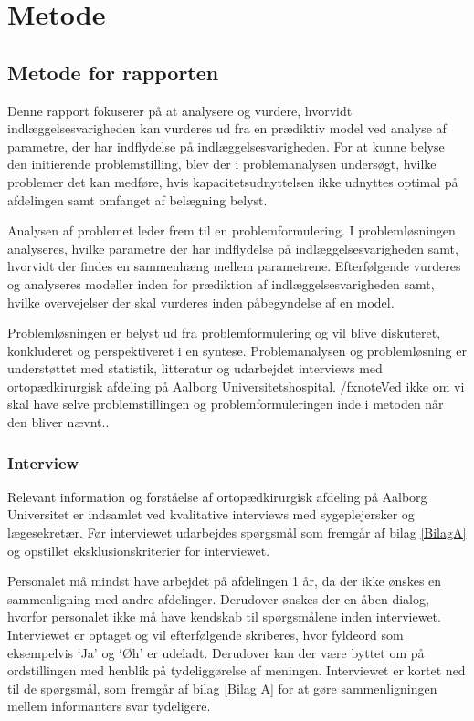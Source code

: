 \chapter*{Metode}
\section*{Metode for rapporten}
Denne rapport fokuserer på at analysere og vurdere, hvorvidt indlæggelsesvarigheden kan vurderes ud fra en prædiktiv model ved analyse af parametre, der har indflydelse på indlæggelsesvarigheden. For at kunne belyse den initierende problemstilling, blev der i problemanalysen undersøgt, hvilke problemer det kan medføre, hvis kapacitetsudnyttelsen ikke udnyttes optimal på afdelingen samt omfanget af belægning belyst.


Analysen af problemet leder frem til en problemformulering. I problemløsningen analyseres, hvilke parametre der har indflydelse på indlæggelsesvarigheden samt, hvorvidt der findes en sammenhæng mellem parametrene. Efterfølgende vurderes og analyseres modeller inden for prædiktion af indlæggelsesvarigheden samt, hvilke overvejelser der skal vurderes inden påbegyndelse af en model. 


Problemløsningen er belyst ud fra problemformulering og vil blive diskuteret, konkluderet og perspektiveret i en syntese. Problemanalysen og problemløsning er understøttet med statistik, litteratur og udarbejdet interviews med ortopædkirurgisk afdeling på Aalborg Universitetshospital.  /fxnote{Ved ikke om vi skal have selve problemstillingen og problemformuleringen inde i metoden når den bliver nævnt.}. 


\subsection*{Interview}
Relevant information og forståelse af ortopædkirurgisk afdeling på Aalborg Universitet er indsamlet ved kvalitative interviews med sygeplejersker og lægesekretær. Før interviewet udarbejdes spørgsmål som fremgår af bilag \ref{BilagA} og opstillet eksklusionskriterier for interviewet. 


Personalet må mindst have arbejdet på afdelingen 1 år, da der ikke ønskes en sammenligning med andre afdelinger. Derudover ønskes der en åben dialog, hvorfor personalet ikke må have kendskab til spørgsmålene inden interviewet. Interviewet er optaget og vil efterfølgende skriberes, hvor fyldeord som eksempelvis ‘Ja’  og ‘Øh’ er udeladt. Derudover kan der være byttet om på ordstillingen med henblik på tydeliggørelse af meningen. Interviewet er kortet ned til de spørgsmål, som fremgår af bilag \ref{Bilag A} for at gøre sammenligningen mellem informanters svar tydeligere.  



